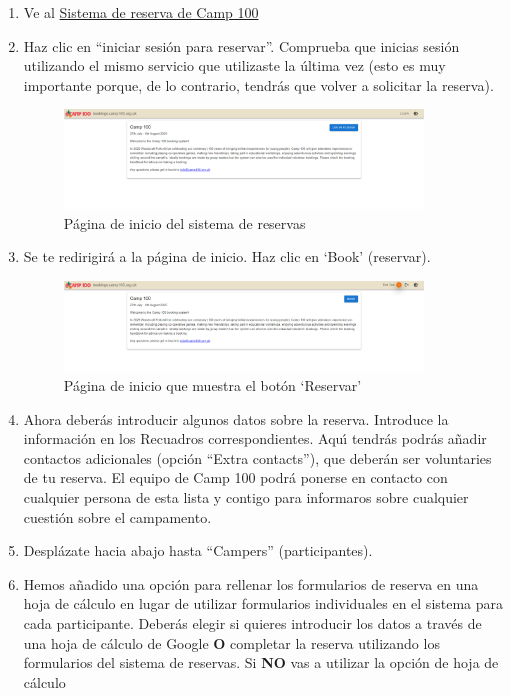 \documentclass[a4paper, 11pt]{report}
\begin{document}
\begin{enumerate}
    \item Ve al \href{https://bookings.camp100.org.uk}{Sistema de reserva de Camp 100}
    \item Haz clic en ``iniciar sesi\'on para reservar''. Comprueba que inicias sesi\'on utilizando el mismo servicio que utilizaste la \'ultima vez (esto es muy importante porque, de lo contrario, tendr\'as que volver a solicitar la reserva).
    \begin{figure}[H]
        \centering
        \includegraphics[width=0.9\textwidth]{assets/2-home-prelogin.png}
        \caption{P\'agina de inicio del sistema de reservas}
    \end{figure}
    \item Se te redirigir\'a a la p\'agina de inicio. Haz clic en `Book' (reservar).
    \begin{figure}[H]
        \centering
        \includegraphics[width=0.9\textwidth]{assets/2-home-loggedin.png}
        \caption{P\'agina de inicio que muestra el bot\'on `Reservar'}
    \end{figure}
    \item Ahora deber\'as introducir algunos datos sobre la reserva. Introduce la informaci\'on en los Recuadros correspondientes. Aqu\'{\i} tendr\'as podr\'as a\~nadir contactos adicionales (opci\'on ``Extra contacts''), que deber\'an ser voluntaries de tu reserva. El equipo de Camp 100 podr\'a ponerse en contacto con cualquier persona de esta lista y contigo para informaros sobre cualquier cuesti\'on sobre el campamento.    
    \item Despl\'azate hacia abajo hasta ``Campers'' (participantes).
    \item Hemos a\~nadido una opci\'on para rellenar los formularios de reserva en una hoja de c\'alculo en lugar de utilizar formularios individuales en el sistema para cada participante. Deber\'as elegir si quieres introducir los datos a trav\'es de una hoja de c\'alculo de Google \textbf{O} completar la reserva utilizando los formularios del sistema de reservas.     
    Si \textbf{NO} vas a utilizar la opci\'on de hoja de c\'alculo 


\end{enumerate}
\end{document}
